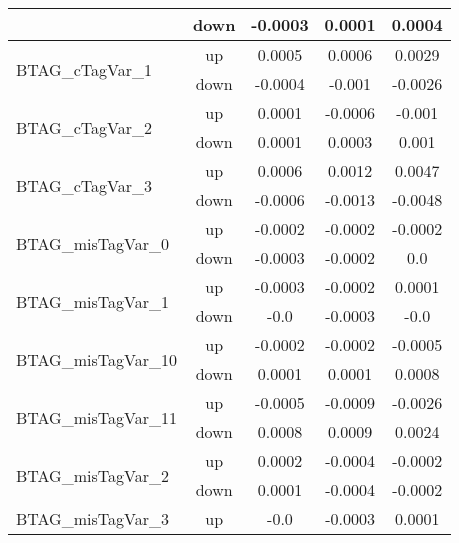 \begin{table}[h!]
\begin{tabular}{lcccc}
                                       & down &     -0.0003     &     0.0001     &     0.0004       \\ \hline
\multirow{2}{*}{BTAG\_cTagVar\_1}      & up   &     0.0005     &     0.0006     &     0.0029      \\
                                       & down &     -0.0004     &     -0.001     &     -0.0026       \\ \hline
\multirow{2}{*}{BTAG\_cTagVar\_2}      & up   &     0.0001     &     -0.0006     &     -0.001      \\
                                       & down &     0.0001     &     0.0003     &     0.001       \\ \hline
\multirow{2}{*}{BTAG\_cTagVar\_3}      & up   &     0.0006     &     0.0012     &     0.0047      \\
                                       & down &     -0.0006     &     -0.0013     &     -0.0048       \\ \hline
\multirow{2}{*}{BTAG\_misTagVar\_0}      & up   &     -0.0002     &     -0.0002     &     -0.0002      \\
                                       & down &     -0.0003     &     -0.0002     &     0.0       \\ \hline
\multirow{2}{*}{BTAG\_misTagVar\_1}      & up   &     -0.0003     &     -0.0002     &     0.0001      \\
                                       & down &     -0.0     &     -0.0003     &     -0.0       \\ \hline
\multirow{2}{*}{BTAG\_misTagVar\_10}      & up   &     -0.0002     &     -0.0002     &     -0.0005      \\
                                       & down &     0.0001     &     0.0001     &     0.0008       \\ \hline
\multirow{2}{*}{BTAG\_misTagVar\_11}      & up   &     -0.0005     &     -0.0009     &     -0.0026      \\
                                       & down &     0.0008     &     0.0009     &     0.0024       \\ \hline
\multirow{2}{*}{BTAG\_misTagVar\_2}      & up   &     0.0002     &     -0.0004     &     -0.0002      \\
                                       & down &     0.0001     &     -0.0004     &     -0.0002       \\ \hline
\multirow{2}{*}{BTAG\_misTagVar\_3}      & up   &     -0.0     &     -0.0003     &     0.0001      \\

\end{tabular}
\end{table}

